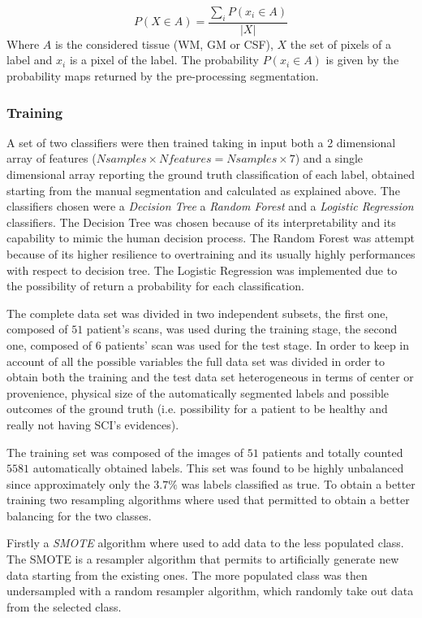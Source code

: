 \documentclass{standalone}
\begin{document}
\begin{equation}\label{eq:probability_tissue_mask}
    P(X \in A) = \frac{\sum_i P(x_i \in A)}{|X|}
\end{equation}
Where $A$ is the considered tissue (WM, GM or CSF), $X$ the set of pixels of a label and $x_i$ is a pixel of the label. The probability $P(x_i \in A)$ is given by the probability maps returned by the pre-processing segmentation.

\subsubsection{Training}
A set of two classifiers were then trained taking in input both a 2 dimensional array of features ($ Nsamples \times Nfeatures = Nsamples \times 7$) and a single dimensional array reporting the ground truth classification of each label, obtained starting from the manual segmentation and calculated as explained above.
The classifiers chosen were a \emph{Decision Tree} a \emph{Random Forest} and a \emph{Logistic Regression} classifiers.
The Decision Tree was chosen because of its interpretability and its capability to mimic the human decision process.
The Random Forest was attempt because of its higher resilience to overtraining and its usually highly performances with respect to decision tree.
The Logistic Regression was implemented due to the possibility of return a probability for each classification.

The complete data set was divided in two independent subsets, the first one, composed of $51$ patient's scans, was used during the training stage, the second one, composed of $6$ patients' scan was used for the test stage. In order to keep in account of all the possible variables the full data set was divided in order to obtain both the training and the test data set heterogeneous in terms of center or provenience, physical size of the automatically segmented labels and possible outcomes of the ground truth (i.e. possibility for a patient to be healthy and really not having SCI's evidences).

The training set was composed of the images of $51$ patients and totally counted $5581$ automatically obtained labels. This set was found to be highly unbalanced since approximately only the $3.7\%$ was labels classified as true.
To obtain a better training two resampling algorithms where used that permitted to obtain a better balancing for the two classes.

Firstly a \emph{SMOTE} \cite{ART:SMOTE} algorithm where used to add data to the less populated class. The SMOTE is a resampler algorithm that permits to artificially generate new data starting from the existing ones.
The more populated class was then undersampled with a random resampler algorithm, which randomly take out data from the selected class.
\end{document}
